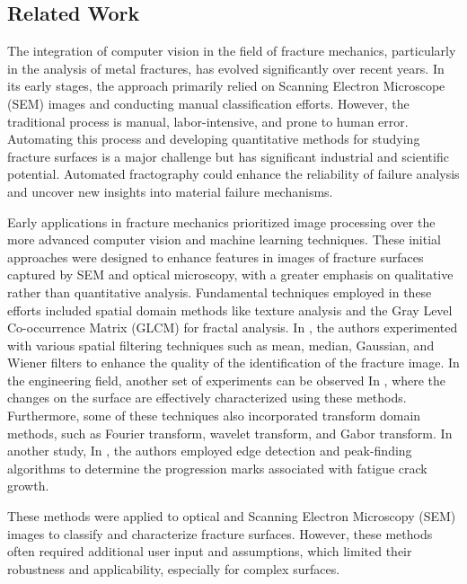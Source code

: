\documentclass[preprint,12pt]{elsarticle}
\begin{document}
\subsection{Related Work}  \label{Subsec:Related Work}
    The integration of computer vision in the field of fracture mechanics, particularly in the analysis of metal fractures, has evolved significantly over recent years.
    In its early stages, the approach primarily relied on Scanning Electron Microscope (SEM) images and conducting manual classification efforts.
    However, the traditional process is manual, labor-intensive, and prone to human error.
    Automating this process and developing quantitative methods for studying fracture surfaces is a major challenge but has significant industrial and scientific potential.
    Automated fractography could enhance the reliability of failure analysis and uncover new insights into material failure mechanisms.




    Early applications in fracture mechanics prioritized image processing over the more advanced computer vision and machine learning techniques.
    These initial approaches were designed to enhance features in images of fracture surfaces captured by SEM and optical microscopy, with a greater emphasis on qualitative rather than quantitative analysis.
    Fundamental techniques employed in these efforts included spatial domain methods like texture analysis and the Gray Level Co-occurrence Matrix (GLCM) for fractal analysis.
  In \cite{zain2009enhancement}, the authors experimented with various spatial filtering techniques such as mean, median, Gaussian, and Wiener filters to enhance the quality of the identification of the fracture image.
    In the engineering field, another set of experiments can be observed In \cite{das2011characterization}, where the changes on the surface are effectively characterized using these methods.
    Furthermore, some of these techniques also incorporated transform domain methods, such as Fourier transform, wavelet transform, and Gabor transform.
    In another study, In \cite{hu2017automation}, the authors employed edge detection and peak-finding algorithms to determine the progression marks associated with fatigue crack growth.

    These methods were applied to optical and Scanning Electron Microscopy (SEM) images to classify and characterize fracture surfaces.
    However, these methods often required additional user input and assumptions, which limited their robustness and applicability, especially for complex surfaces.
\end{document}
